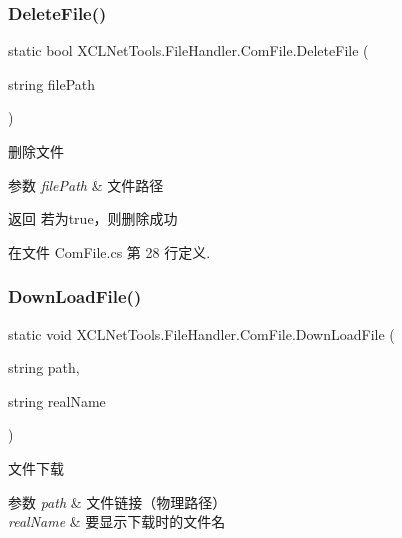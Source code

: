 \subsubsection{\texorpdfstring{Delete\+File()}{DeleteFile()}}
{\footnotesize\ttfamily static bool X\+C\+L\+Net\+Tools.\+File\+Handler.\+Com\+File.\+Delete\+File (\begin{DoxyParamCaption}\item[{string}]{file\+Path }\end{DoxyParamCaption})\hspace{0.3cm}{\ttfamily [static]}}



删除文件 


\begin{DoxyParams}{参数}
{\em file\+Path} & 文件路径\\
\hline
\end{DoxyParams}
\begin{DoxyReturn}{返回}
若为true，则删除成功
\end{DoxyReturn}


在文件 Com\+File.\+cs 第 28 行定义.

\mbox{\label{class_x_c_l_net_tools_1_1_file_handler_1_1_com_file_a88a411e0efbbb5117f62ae15734b5a4b}} 
\subsubsection{\texorpdfstring{Down\+Load\+File()}{DownLoadFile()}}
{\footnotesize\ttfamily static void X\+C\+L\+Net\+Tools.\+File\+Handler.\+Com\+File.\+Down\+Load\+File (\begin{DoxyParamCaption}\item[{string}]{path,  }\item[{string}]{real\+Name }\end{DoxyParamCaption})\hspace{0.3cm}{\ttfamily [static]}}



文件下载 


\begin{DoxyParams}{参数}
{\em path} & 文件链接（物理路径）\\
\hline
{\em real\+Name} & 要显示下载时的文件名\\
\hline
\end{DoxyParams}


